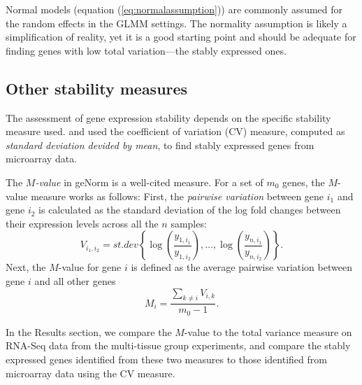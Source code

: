 \documentclass[fleqn,10pt,lineno]{wlpeerj} %
\begin{document}
Normal models (equation (\ref{eq:normalassumption})) are commonly assumed for
the random effects in the GLMM settings. The normality assumption is likely a
simplification of reality, yet it is a good starting point and should be
adequate for finding genes with low total variation---the stably expressed
ones.

\subsection{Other stability measures}\label{subsection:OtherStabilityMeasure}
The assessment of gene expression stability depends on the specific stability
measure used. 
\citeauthor{czechowski2005genome} and \citeauthor{dekkers2012identification} used  the
coefficient of variation (CV) measure, computed as \textit{standard
	deviation devided by mean}, to find stably expressed genes from microarray data.


The \textit{$M$-value} in geNorm \citep{vandesompele2002accurate} is a
well-cited measure. For a set of $m_0$ genes, the $M$-value measure works as
follows: First, the {\em pairwise variation} between gene $i_1$ and gene $i_2$ is
calculated as the standard deviation of the log fold changes between their
expression levels across all the $n$ samples: 
\[V_{i_1, i_2} =\textit{st.dev}
\left\{\log\left(\dfrac{y_{1,i_1}}{y_{1, i_2}}\right),\ldots,
\log\left(\dfrac{y_{n, i_1}}{y_{n, i_2}}\right) \right\}.\]
Next, the $M$-value for gene $i$ is defined as the average pairwise
variation between gene $i$ and all other genes
\[M_{i} = \frac{\sum_{k\neq i}V_{i, k}}{m_0-1}.\] 


In the Results section, we compare the $M$-value to the total variance measure
on RNA-Seq data from the multi-tissue group experiments, and compare the
stably expressed genes identified from these two measures to those identified
from microarray data using the CV measure.
\end{document}
